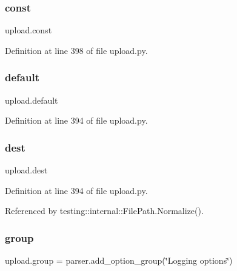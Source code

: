 \mbox{\label{namespaceupload_a985aa9a71de3eb507344df65700c696d}} 
\subsubsection{\texorpdfstring{const}{const}}
{\footnotesize\ttfamily upload.\+const}



Definition at line 398 of file upload.\+py.

\mbox{\label{namespaceupload_af4be925d9a50d5ad134d86400509d0f2}} 
\subsubsection{\texorpdfstring{default}{default}}
{\footnotesize\ttfamily upload.\+default}



Definition at line 394 of file upload.\+py.

\mbox{\label{namespaceupload_a770d9c7b49b1fede80de6078d5e49af7}} 
\subsubsection{\texorpdfstring{dest}{dest}}
{\footnotesize\ttfamily upload.\+dest}



Definition at line 394 of file upload.\+py.



Referenced by testing\+::internal\+::\+File\+Path.\+Normalize().

\mbox{\label{namespaceupload_a9d33d66de17175dced88ffe95f079226}} 
\subsubsection{\texorpdfstring{group}{group}}
{\footnotesize\ttfamily upload.\+group = parser.\+add\+\_\+option\+\_\+group(\char`\"{}Logging options\char`\"{})}



